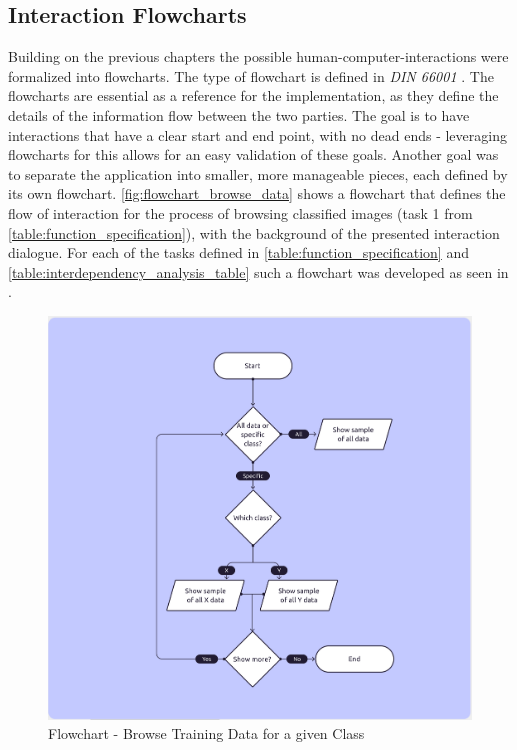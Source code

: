 \documentclass[11pt,a4paper,english]{scrreprt}
\begin{document}
\subsection{Interaction Flowcharts}
Building on the previous chapters the possible human-computer-interactions were formalized into flowcharts. The type of flowchart is defined in \textit{DIN 66001} \parencite{hering_programmablaufplan_1984}. The flowcharts are essential as a reference for the implementation, as they define the details of the information flow between the two parties. The goal is to have interactions that have a clear start and end point, with no dead ends - leveraging flowcharts for this allows for an easy validation of these goals. Another goal was to separate the application into smaller, more manageable pieces, each defined by its own flowchart. \autoref{fig:flowchart_browse_data} shows a flowchart that defines the flow of interaction for the process of browsing classified images (task 1 from \autoref{table:function_specification}), with the background of the presented interaction dialogue. For each of the tasks defined in \autoref{table:function_specification} and \autoref{table:interdependency_analysis_table} such a flowchart was developed as seen in .
\begin{figure}[htbp]
    \centering
    \includegraphics[width=\textwidth]{img/figures/flowcharts/browse_train_data_for_chosen_class.png}
    \caption{Flowchart - Browse Training Data for a given Class}
    \label{fig:flowchart_browse_data}
\end{figure}
\end{document}
